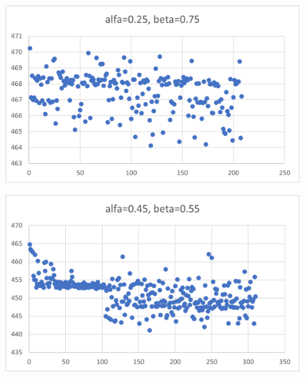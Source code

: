 \documentclass[12pt]{mwart}
\begin{document}
	\begin{figure}[H]
		\centering
		\includegraphics{470_a0.25.png}
	\end{figure}
	\begin{figure}[H]
		\centering
		\includegraphics{470_a0.45.png}
	\end{figure}
\end{document}
